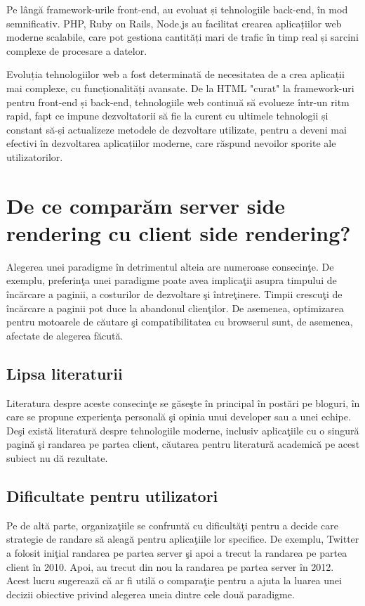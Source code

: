 \documentclass[12pt, a4paper]{report}
\begin{document}
Pe lângă framework-urile front-end, au evoluat și tehnologiile back-end, în mod semnificativ. PHP, Ruby on Rails, Node.js au facilitat crearea aplicațiilor web moderne scalabile, care pot gestiona cantități mari de trafic în timp real și sarcini complexe de procesare a datelor.

Evoluția tehnologiilor web a fost determinată de necesitatea de a crea aplicații mai complexe, cu funcționalități avansate. De la HTML "curat" la framework-uri pentru front-end și back-end, tehnologiile web continuă să evolueze într-un ritm rapid, fapt ce impune dezvoltatorii să fie la curent cu ultimele tehnologii și constant să-și actualizeze metodele de dezvoltare utilizate, pentru a deveni mai efectivi în dezvoltarea aplicațiilor moderne, care răspund nevoilor sporite ale utilizatorilor.



\section{De ce compar\u am server side rendering cu client side rendering?}

Alegerea unei paradigme \^ in detrimentul alteia are numeroase consecin\c te. De exemplu, preferin\c ta unei paradigme poate avea implica\c tii asupra timpului de \^ inc\u arcare a paginii, a costurilor de dezvoltare \c si \^ intre\c tinere. Timpii crescu\c ti de \^ inc\u arcare a paginii pot duce la abandonul clien\c tilor. De asemenea, optimizarea pentru motoarele de c\u autare \c si compatibilitatea cu browserul sunt, de asemenea, afectate de alegerea f\u acut\u a.

\subsection{Lipsa literaturii}
Literatura despre aceste consecin\c te se g\u ase\c ste \^ in principal \^ in post\u ari pe bloguri, \^ in care se propune experien\c ta personal\u a \c si opinia unui developer sau a unei echipe. De\c si exist\u a literatur\u a despre tehnologiile moderne, inclusiv aplica\c tiile cu o singur\u a pagin\u a \c si randarea pe partea client, c\u autarea pentru literatur\u a academic\u a pe acest subiect nu d\u a rezultate.

\subsection{Dificultate pentru utilizatori}
Pe de alt\u a parte, organiza\c tiile se confrunt\u a cu dificult\u a\c ti pentru a decide care strategie de randare s\u a aleag\u a pentru aplica\c tiile lor specifice. De exemplu, Twitter a folosit ini\c tial randarea pe partea server \c si apoi a trecut la randarea pe partea client \^ in 2010. Apoi, au trecut din nou la randarea pe partea server \^ in 2012. Acest lucru sugereaz\u a c\u a ar fi util\u a o compara\c tie pentru a ajuta la luarea unei decizii obiective privind alegerea uneia dintre cele dou\u a paradigme.
\end{document}
